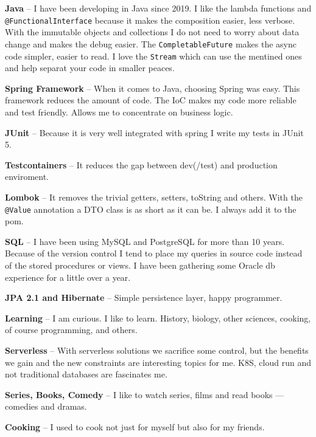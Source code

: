 \documentclass[9pt]{developercv} %
\begin{document}
\begin{minipage}[t]{0.49\textwidth}
    \vspace{-\baselineskip} %


    \textbf{Java} -- I have been developing in Java since 2019.
        I like the lambda functions and \texttt{@FunctionalInterface} because it makes the composition easier, less verbose.
        With the immutable objects and collections I do not need to worry about data change and makes the debug easier.
        The \texttt{CompletableFuture} makes the async code simpler, easier to read.
        I love the \texttt{Stream} which can use the mentined ones and help separat your code in smaller peaces.

    \textbf{Spring Framework} -- When it comes to Java, choosing Spring was easy.
    This framework reduces the amount of code. 
    The IoC makes my code more reliable and test friendly. Allows me to concentrate on business logic.
    

    \textbf{JUnit} -- Because it is very well integrated with spring I write my tests in JUnit 5.

    \textbf{Testcontainers} -- It reduces the gap between dev(/test) and production enviroment.

    \textbf{Lombok} -- It removes the trivial getters, setters, toString and others. With the \texttt{@Value} annotation a DTO class is as short as it can be. I always add it to the pom.

    \textbf{SQL} -- I have been using MySQL and PostgreSQL for more than 10 years.
    Because of the version control I tend to place my queries in source code instead of the stored procedures or views. I have been gathering some Oracle db experience for a little over a year.

    \textbf{JPA 2.1 and Hibernate} -- Simple persistence layer, happy programmer.

\end{minipage}


\textbf{Learning} -- I am curious. I like to learn. History, biology, other sciences, cooking, of course programming, and others.

\textbf{Serverless} -- With serverless solutions we sacrifice some control, but the benefits we gain and the new constraints are interesting topics for me. K8S, cloud run and not traditional databases are fascinates me.

\textbf{Series, Books, Comedy} -- I like to watch series, films and read books — comedies and dramas.

\textbf{Cooking} -- I used to cook not just for myself but also for my friends.
\end{document}
